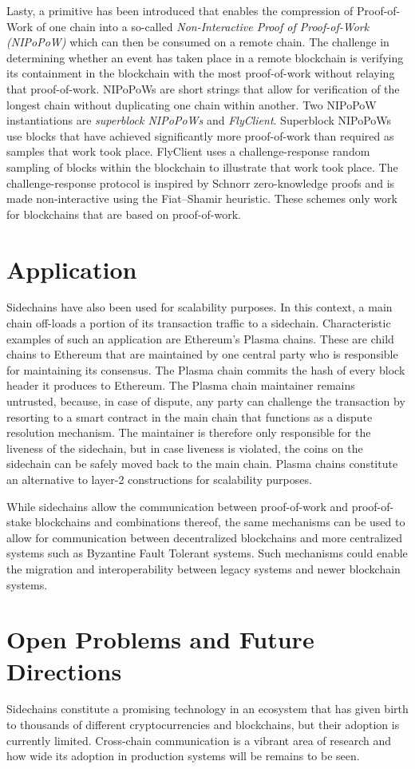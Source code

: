 \documentclass[runningheads]{format/llncs}
\begin{document}
Lasty, a primitive has been introduced that enables the compression of Proof-of-Work of one chain into a so-called \emph{Non-Interactive Proof of Proof-of-Work \cite{nipopows} (NIPoPoW)} which can then be consumed on a remote chain. The challenge in determining whether an event has taken place in a remote blockchain is verifying its containment in the blockchain with the most proof-of-work without relaying that proof-of-work. NIPoPoWs are short strings that allow for verification of the longest chain without duplicating one chain within another. Two NIPoPoW instantiations are \emph{superblock NIPoPoWs} and \emph{FlyClient}. Superblock NIPoPoWs use blocks that have achieved significantly more proof-of-work than required as samples that work took place. FlyClient uses a challenge-response random sampling of blocks within the blockchain to illustrate that work took place. The challenge-response protocol is inspired by Schnorr zero-knowledge proofs and is made non-interactive using the Fiat–Shamir heuristic. These schemes only work for blockchains that are based on proof-of-work.

\section*{Application}
Sidechains have also been used for scalability purposes. In this context, a main chain off-loads a portion of its transaction traffic to a sidechain. Characteristic examples of such an application are Ethereum’s Plasma chains. These are child chains to Ethereum that are maintained by one central party  who is responsible for maintaining its consensus. The Plasma chain commits the hash of every block header it produces to Ethereum. The Plasma chain maintainer remains untrusted, because, in case of dispute, any party can challenge the transaction by resorting to a smart contract in the main chain that functions as a dispute resolution mechanism. The maintainer is therefore only responsible for the liveness of the sidechain, but in case liveness is violated, the coins on the sidechain can be safely moved back to the main chain. Plasma chains constitute an alternative to layer-2 constructions for scalability purposes.

While sidechains allow the communication between proof-of-work and proof-of-stake blockchains and combinations thereof, the same mechanisms can be used to allow for communication between decentralized blockchains and more centralized systems such as Byzantine Fault Tolerant systems. Such mechanisms could enable the migration and interoperability between legacy systems and newer blockchain systems.

\section*{Open Problems and Future Directions}
Sidechains constitute a promising technology in an ecosystem that has given birth to thousands of different cryptocurrencies and blockchains, but their adoption is currently limited. Cross-chain communication is a vibrant area of research and how wide its adoption in production systems will be remains to be seen.



\end{document}
